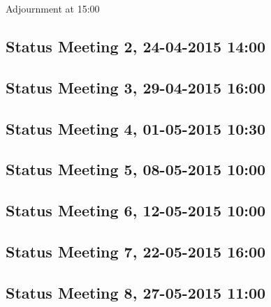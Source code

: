 Adjournment at 15:00

\subsection{Status Meeting 2, 24-04-2015 14:00}


\subsection{Status Meeting 3, 29-04-2015 16:00}


\subsection{Status Meeting 4, 01-05-2015 10:30}


\subsection{Status Meeting 5, 08-05-2015 10:00}


\subsection{Status Meeting 6, 12-05-2015 10:00}


\subsection{Status Meeting 7, 22-05-2015 16:00}


\subsection{Status Meeting 8, 27-05-2015 11:00}
